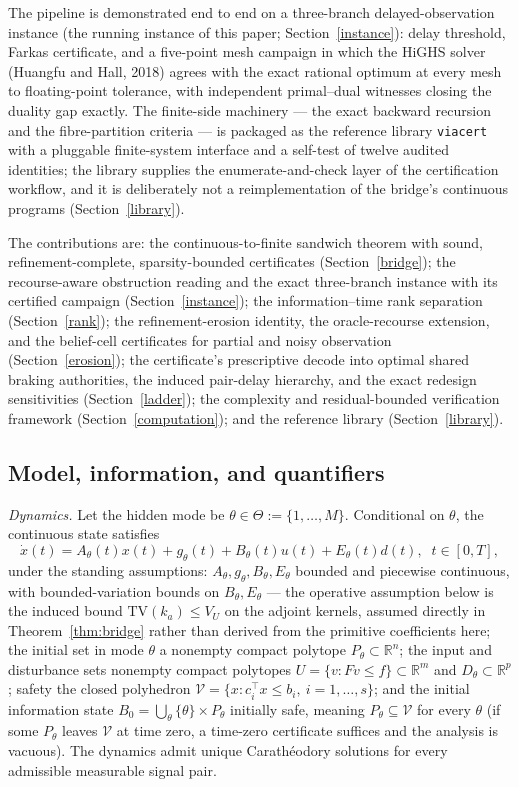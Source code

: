\documentclass[10pt,twocolumn]{article}
\theoremstyle{plain}
\theoremstyle{definition}
\theoremstyle{remark}
\begin{document}
The pipeline is demonstrated end to end on a three-branch
delayed-observation instance (the running instance of this paper;
Section~\ref{instance}): delay threshold, Farkas certificate, and a
five-point mesh campaign in which the HiGHS solver (Huangfu and Hall, 2018)
agrees with the exact rational optimum at every mesh to floating-point
tolerance, with independent
primal--dual witnesses closing the duality gap exactly. The finite-side
machinery --- the exact backward recursion and the fibre-partition criteria
--- is packaged as the reference library \texttt{viacert} with a pluggable
finite-system interface and a self-test of twelve audited identities; the
library supplies the enumerate-and-check layer of the certification
workflow, and it is deliberately not a reimplementation of the bridge's
continuous programs (Section~\ref{library}).

The contributions are: the continuous-to-finite sandwich theorem with sound,
refinement-complete, sparsity-bounded certificates (Section~\ref{bridge});
the recourse-aware obstruction reading and the exact three-branch instance
with its certified campaign (Section~\ref{instance}); the
information--time rank separation (Section~\ref{rank}); the refinement-erosion
identity, the oracle-recourse extension, and the belief-cell certificates
for partial and noisy observation (Section~\ref{erosion}); the
certificate's prescriptive decode into optimal shared braking authorities,
the induced pair-delay hierarchy, and the exact redesign sensitivities
(Section~\ref{ladder}); the
complexity and residual-bounded verification framework
(Section~\ref{computation}); and the reference library
(Section~\ref{library}).

\subsection{Model, information, and quantifiers}\label{model}

\emph{Dynamics.} Let the hidden mode be
\(\theta \in \Theta := \{1,\dots,M\}\). Conditional on \(\theta\), the
continuous state satisfies
\[
\dot x(t) = A_\theta(t)x(t) + g_\theta(t) + B_\theta(t)u(t) + E_\theta(t)d(t),
\;\; t \in [0,T],
\]
under the standing assumptions: \(A_\theta, g_\theta, B_\theta, E_\theta\)
bounded and piecewise continuous, with bounded-variation bounds on
\(B_\theta, E_\theta\) --- the operative assumption below is the induced
bound \(\mathrm{TV}(k_a) \le V_U\) on the adjoint kernels, assumed
directly in Theorem~\ref{thm:bridge} rather than derived from the
primitive coefficients here; the initial set in mode \(\theta\) a nonempty compact
polytope \(P_\theta \subset \mathbb{R}^n\); the input and disturbance sets
nonempty compact polytopes \(U = \{v : Fv \le f\} \subset \mathbb{R}^m\) and
\(D_\theta \subset \mathbb{R}^p\); safety the closed polyhedron
\(\mathcal{V} = \{x : c_i^\top x \le b_i,\ i = 1,\dots,s\}\); and the initial
information state
\(B_0 = \bigcup_{\theta} \{\theta\} \times P_\theta\) initially safe,
meaning \(P_\theta \subseteq \mathcal{V}\) for every \(\theta\) (if some
\(P_\theta\) leaves \(\mathcal{V}\) at time zero, a time-zero certificate
suffices and the analysis is vacuous). The dynamics admit unique
Carath\'eodory solutions for every admissible measurable signal pair.
\end{document}
